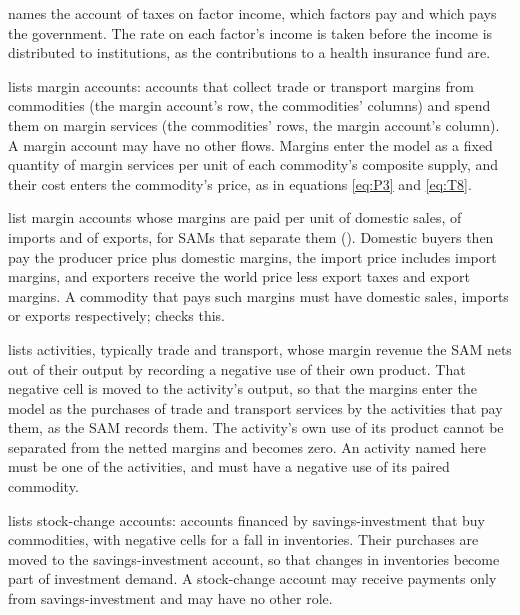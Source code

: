 \begin{optdesc}
\item[\optarg{factorinc}{ometax}{name}] names the account of taxes on factor
income, which factors pay and which pays the government. The rate on each
factor's income is taken before the income is distributed to institutions, as
the contributions to a health insurance fund are.

\item[\optarg{}{marginaccounts}{namelist}] lists margin accounts: accounts that
collect trade or transport margins from commodities (the margin account's row,
the commodities' columns) and spend them on margin services (the commodities'
rows, the margin account's column). A margin account may have no other flows.
Margins enter the model as a fixed quantity of margin services per unit of
each commodity's composite supply, and their cost enters the commodity's
price, as in equations \eqref{eq:P3} and \eqref{eq:T8}.

\item[\optarg{domestic}{margins}{namelist}, \optarg{import}{margins}{namelist}
and \optarg{export}{margins}{namelist}] list margin accounts whose margins are
paid per unit of domestic sales, of imports and of exports, for SAMs that
separate them (). Domestic buyers then pay the
producer price plus domestic margins, the import price includes import
margins, and exporters receive the world price less export taxes and export
margins. A commodity that pays such margins must have domestic sales, imports
or exports respectively;  checks this.

\item[\optarg{}{margins}{namelist}] lists activities, typically trade and
transport, whose margin revenue the SAM nets out of their output by recording
a negative use of their own product. That negative cell is moved to the
activity's output, so that the margins enter the model as the purchases of
trade and transport services by the activities that pay them, as the SAM
records them. The activity's own use of its product cannot be separated from
the netted margins and becomes zero. An activity named here must be one of
the activities, and must have a negative use of its paired commodity.

\item[\optarg{}{stocks}{namelist}] lists stock-change accounts: accounts
financed by savings-investment that buy commodities, with negative cells for a
fall in inventories. Their purchases are moved to the savings-investment
account, so that changes in inventories become part of investment demand. A
stock-change account may receive payments only from savings-investment and may
have no other role.


\end{optdesc}
